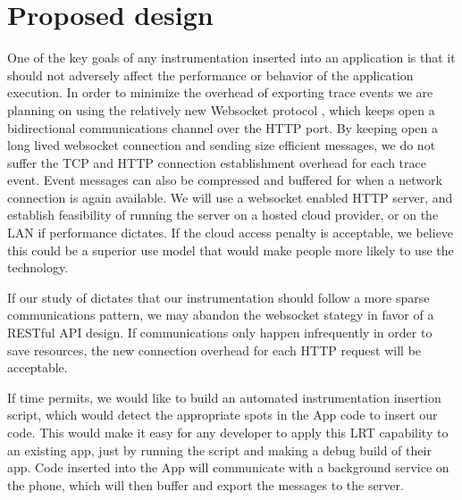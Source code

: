 \documentclass[11pt]{article}
\begin{document}
\section{Proposed design}
One of the key goals of any instrumentation inserted into an application is 
that it should not adversely affect the performance or behavior of the 
application execution. In order to minimize the overhead of exporting trace 
events we are planning on using the relatively new Websocket protocol 
\cite{WebsocketRFC}, which keeps open a bidirectional communications channel 
over the HTTP port. By keeping open a long lived 
websocket connection and sending size efficient 
messages, we do not suffer the TCP and HTTP connection establishment overhead 
for each trace event. Event messages can also be compressed and buffered for when a 
network connection is again available. We will use a websocket enabled HTTP 
server, and establish feasibility of running the server on a hosted cloud 
provider, or on the LAN if performance dictates. If the cloud access penalty is 
acceptable, we believe this could be a superior use model that would make people
more likely to use the technology. 

If our study of \cite{PeriodicTransfers} dictates that
our instrumentation should follow a more sparse communications pattern, we may abandon the
websocket stategy in favor of a RESTful API\cite{REST} design. If communications
only happen infrequently in order to save resources, the new connection overhead for
each HTTP request will be acceptable.

If time permits, we would like to build an automated instrumentation insertion 
script, which would detect the appropriate spots in the App code to insert our 
code. This would make it easy for any developer to apply this LRT capability to
an existing app, just by running the script and making a debug build of their 
app. Code inserted into the App will communicate with a background service on 
the phone, which will then buffer and export the messages to the server.




{}

\end{document}
